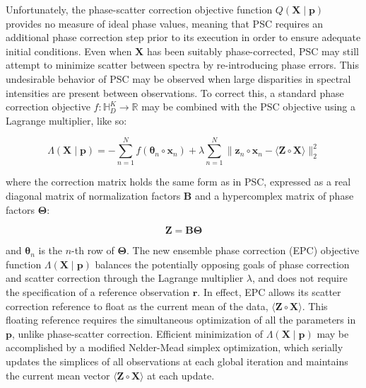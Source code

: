 \begin{doublespace}
Unfortunately, the phase-scatter correction objective function
$Q(\mathbf{X} \mid \mathbf{p})$ provides no measure of ideal phase values,
meaning that PSC requires an additional phase correction step prior to its
execution in order to ensure adequate initial conditions. Even when
$\mathbf{X}$ has been suitably phase-corrected, PSC may still attempt to
minimize scatter between spectra by re-introducing phase errors. This
undesirable behavior of PSC may be observed when large disparities in
spectral intensities are present between observations. To correct this,
a standard phase correction objective
$f : \mathbb{H}_D^{K} \to \mathbb{R}$ may be combined with
the PSC objective using a Lagrange multiplier, like so:

\begin{equation}
\Lambda(\mathbf{X} \mid \mathbf{p}) =
 -\sum_{n=1}^N f(\boldsymbol{\theta}_n \circ \mathbf{x}_n) +
 \lambda \sum_{n=1}^N \| \mathbf{z}_n \circ \mathbf{x}_n -
            \langle \mathbf{Z} \circ \mathbf{X} \rangle \|_2^2
\end{equation}

where the correction matrix holds the same form as in PSC, expressed as a
real diagonal matrix of normalization factors $\mathbf{B}$ and a hypercomplex
matrix of phase factors $\mathbf{\Theta}$:

\begin{equation}
\mathbf{Z} = \mathbf{B} \mathbf{\Theta}
\end{equation}

and $\boldsymbol{\theta}_n$ is the $n$-th row of $\mathbf{\Theta}$. The new
ensemble phase correction (EPC) objective function
$\Lambda(\mathbf{X} \mid \mathbf{p})$ balances the potentially opposing goals
of phase correction and scatter correction through the Lagrange multiplier
$\lambda$, and does not require the specification of a reference observation
$\mathbf{r}$. In effect, EPC allows its scatter correction reference to float
as the current mean of the data, $\langle \mathbf{Z} \circ \mathbf{X} \rangle$.
This floating reference requires the simultaneous optimization of all the
parameters in $\mathbf{p}$, unlike phase-scatter correction. Efficient
minimization of $\Lambda(\mathbf{X} \mid \mathbf{p})$ may be accomplished by
a modified Nelder-Mead simplex optimization, which serially updates the
simplices of all observations at each global iteration and maintains the
current mean vector $\langle \mathbf{Z} \circ \mathbf{X} \rangle$ at each
update.
\end{doublespace}

